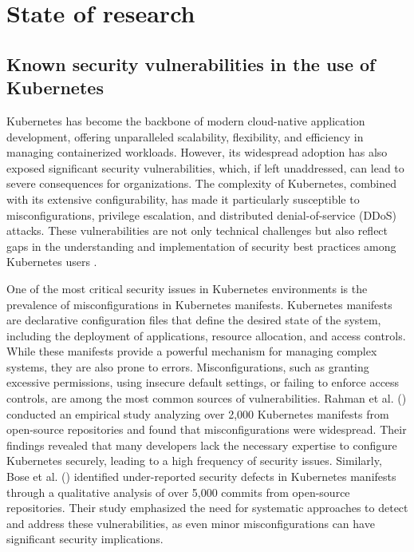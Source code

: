 

\section{State of research} \label{cha:stateOfResearch}

\subsection{Known security vulnerabilities in the use of Kubernetes}

Kubernetes has become the backbone of modern cloud-native application development, offering unparalleled scalability, flexibility, and efficiency in managing containerized workloads. However, its widespread adoption has also exposed significant security vulnerabilities, which, if left unaddressed, can lead to severe consequences for organizations. The complexity of Kubernetes, combined with its extensive configurability, has made it particularly susceptible to misconfigurations, privilege escalation, and distributed denial-of-service (DDoS) attacks. These vulnerabilities are not only technical challenges but also reflect gaps in the understanding and implementation of security best practices among Kubernetes users \citep{rahman2023, bose2021}.

One of the most critical security issues in Kubernetes environments is the prevalence of misconfigurations in Kubernetes manifests. Kubernetes manifests are declarative configuration files that define the desired state of the system, including the deployment of applications, resource allocation, and access controls. While these manifests provide a powerful mechanism for managing complex systems, they are also prone to errors. Misconfigurations, such as granting excessive permissions, using insecure default settings, or failing to enforce access controls, are among the most common sources of vulnerabilities. Rahman et al. (\citeyear{rahman2023}) conducted an empirical study analyzing over 2,000 Kubernetes manifests from open-source repositories and found that misconfigurations were widespread. Their findings revealed that many developers lack the necessary expertise to configure Kubernetes securely, leading to a high frequency of security issues. Similarly, Bose et al. (\citeyear{bose2021}) identified under-reported security defects in Kubernetes manifests through a qualitative analysis of over 5,000 commits from open-source repositories. Their study emphasized the need for systematic approaches to detect and address these vulnerabilities, as even minor misconfigurations can have significant security implications.

